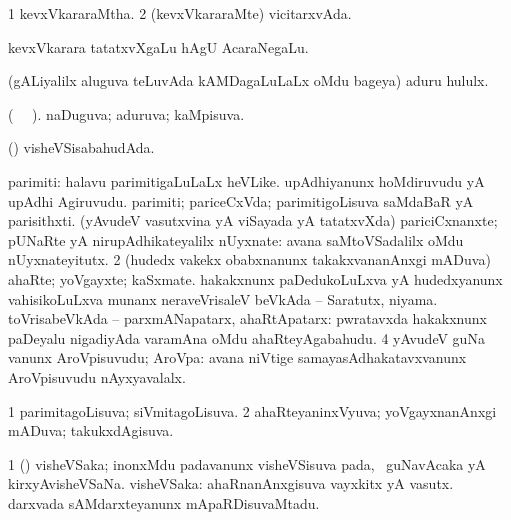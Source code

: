 \bentry
{}
\gl{\gu}
\bmng
\bnum
\num{1} kevxVkararaMtha. 
\num{2} (kevxVkararaMte) vicitarxvAda. 
\enum
\emng
\eentry

\bentry
{}
\gl{\nA}
\bmng
kevxVkarara tatatxvXgaLu hAgU AcaraNegaLu. 
\emng
\eentry

\bentry
{}
\gl{\nA}
\bmng
(gALiyalilx aluguva teLuvAda kAMDagaLuLaLx oMdu bageya) aduru hululx. 
\emng
\eentry

\bentry
{}
\gl{\gu}
\bmng
(\tara\  \tama\ ). naDuguva; aduruva; kaMpisuva. 
\emng
\eentry

\bentry
{}
\gl{\gu}
\bmng
(\vAyx) visheVSisabahudAda. 
\emng
\eentry

\bentry
{}
\gl{\nA}
\bmng
\bnum
{} 
\banum
{} parimiti:   halavu parimitigaLuLaLx heVLike. 
 upAdhiyanunx hoMdiruvudu yA upAdhi Agiruvudu. 
 parimiti; pariceCxVda; parimitigoLisuva saMdaBaR yA parisithxti. 
 (yAvudeV vasutxvina yA viSayada yA tatatxvXda) pariciCxnanxte; pUNaRte yA nirupAdhikateyalilx nUyxnate:   avana saMtoVSadalilx oMdu nUyxnateyitutx. 
\eanum
\numie
\num{2} (hudedx \mo vakekx obabxnanunx takakxvananAnxgi mADuva) ahaRte; yoVgayxte; kaSxmate. 
 hakakxnunx paDedukoLuLxva yA hudedxyanunx vahisikoLuLxva munanx 
\banum
{} neraveVrisaleV beVkAda -- Saratutx, niyama. 
 toVrisabeVkAda -- parxmANapatarx, ahaRtApatarx:  pwratavxda hakakxnunx paDeyalu nigadiyAda varamAna oMdu ahaRteyAgabahudu. 
\eanum
\numie
\num{4} yAvudeV guNa \mo vanunx AroVpisuvudu; AroVpa:  avana niVtige samayasAdhakatavxvanunx AroVpisuvudu nAyxyavalalx. 
\enum
\emng
\eentry

\bentry
{}
\gl{\gu}
\bmng
\bnum
\num{1} parimitagoLisuva; siVmitagoLisuva. 
\num{2} ahaRteyaninxVyuva; yoVgayxnanAnxgi mADuva; takukxdAgisuva. 
\enum
\emng
\eentry

\bentry
{}
\gl{\nA}
\bmng
\bnum
\num{1} (\vAyx) visheVSaka; inonxMdu padavanunx visheVSisuva pada, \udA\ guNavAcaka yA kirxyAvisheVSaNa. 
 visheVSaka: 
\banum
{} ahaRnanAnxgisuva vayxkitx yA vasutx. 
 darxvada sAMdarxteyanunx mApaRDisuvaMtadu. 
\eanum
\numie
\enum
\emng
\eentry

